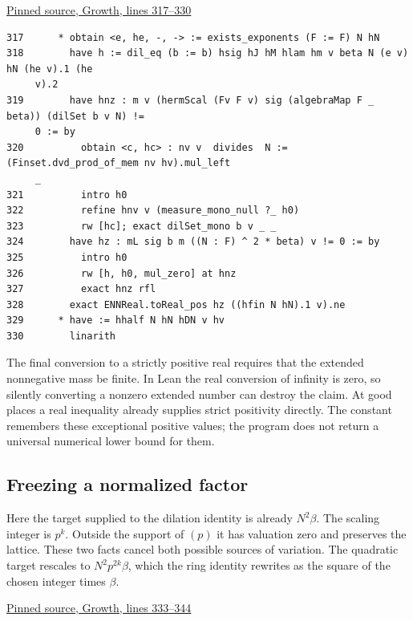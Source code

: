 \documentclass[12pt,letterpaper]{article}
\begin{document}
\par\smallskip\href{https://github.com/nousentllc/riemann-hypothesis/blob/40e56bab026552e089d7afcfeff08d2defb9c005/src/CompanionTheory/SpectralGeometry/LocalGlobalProofs/AdelicAnalysis/RankOneLocalDensitiesProductConverges.lean#L317-L330}{\sffamily\small Pinned source, Growth, lines 317--330}\par

{\footnotesize\begin{verbatim}
317      * obtain <e, he, -, -> := exists_exponents (F := F) N hN
318        have h := dil_eq (b := b) hsig hJ hM hlam hm v beta N (e v) hN (he v).1 (he
     v).2
319        have hnz : m v (hermScal (Fv F v) sig (algebraMap F _ beta)) (dilSet b v N) !=
     0 := by
320          obtain <c, hc> : nv v  divides  N := (Finset.dvd_prod_of_mem nv hv).mul_left
     _
321          intro h0
322          refine hnv v (measure_mono_null ?_ h0)
323          rw [hc]; exact dilSet_mono b v _ _
324        have hz : mL sig b m ((N : F) ^ 2 * beta) v != 0 := by
325          intro h0
326          rw [h, h0, mul_zero] at hnz
327          exact hnz rfl
328        exact ENNReal.toReal_pos hz ((hfin N hN).1 v).ne
329      * have := hhalf N hN hDN v hv
330        linarith
\end{verbatim}
}

The final conversion to a strictly positive real requires that the extended nonnegative mass be finite. In Lean the real conversion of infinity is zero, so silently converting a nonzero extended number can destroy the claim. At good places a real inequality already supplies strict positivity directly. The constant remembers these exceptional positive values; the program does not return a universal numerical lower bound for them.

\clearpage\subsection*{Freezing a normalized factor}

Here the target supplied to the dilation identity is already \(N^2\beta\). The scaling integer is \(p^k\). Outside the support of \((p)\) it has valuation zero and preserves the lattice. These two facts cancel both possible sources of variation. The quadratic target rescales to \(N^2p^{2k}\beta\), which the ring identity rewrites as the square of the chosen integer times \(\beta\).

\par\smallskip\href{https://github.com/nousentllc/riemann-hypothesis/blob/40e56bab026552e089d7afcfeff08d2defb9c005/src/CompanionTheory/SpectralGeometry/LocalGlobalProofs/AdelicAnalysis/RankOneLocalDensitiesProductConverges.lean#L333-L344}{\sffamily\small Pinned source, Growth, lines 333--344}\par
\end{document}
